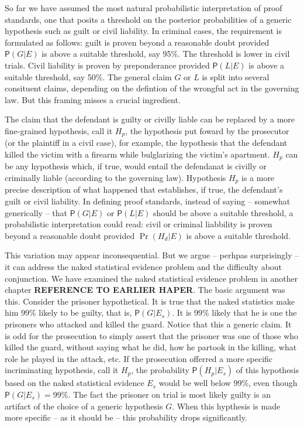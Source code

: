 \documentclass[10pt,dvipsnames,enabledeprecatedfontcommands]{scrartcl}
\newcommand{\pr}[1]{\mathsf{P}(#1)}
\begin{document}
So far we have assumed the most natural probabilistic interpretation of
proof standards, one that posits a threshold on the posterior
probabilities of a generic hypothesis such as guilt or civil liability.
In criminal cases, the requirement is formulated as follows: guilt is
proven beyond a reasonable doubt provided \(\pr{G | E}\) is above a
suitable threshold, say 95\%. The threshold is lower in civil trials.
Civil liability is proven by preponderance provided \(\pr{L | E}\) is
above a suitable threshold, say 50\%. The general claim \(G\) or \(L\)
is split into several consituent claims, depending on the defintion of
the wrongful act in the governing law. But this framing misses a crucial
ingredient.

The claim that the defendant is guilty or civilly liable can be replaced
by a more fine-grained hypothesis, call it \(H_p\), the hypothesis put
foward by the prosecutor (or the plaintiff in a civil case), for
example, the hypothesis that the defendant killed the victim with a
firearm while bulglarizing the victim's apartment. \(H_p\) can be any
hypothesis which, if true, would entail the defendanat is civilly or
criminally liable (according to the governing law). Hypothesis \(H_p\)
is a more precise description of what happened that establishes, if
true, the defendant's guilt or civil liability. In defining proof
standards, instead of saying -- somewhat generically -- that
\(\pr{G | E}\) or \(\pr{L | E}\) should be above a suitable threshold, a
probabilistic interpretation could read: civil or criminal liabbility is
proven beyond a reasonable doubt provided \(\Pr(H_d | E)\) is above a
suitable threshold.

This variation may appear inconsequential. But we argue -- perhpas
surprisingly -- it can address the naked statistical evidence problem
and the difficulty about conjunction. We have examined the naked
statistical evidence problem in another chapter
\textbf{REFERENCE TO EARLIER HAPER}. The basic argument was this.
Consider the prisoner hypothetical. It is true that the naked statistics
make him 99\% likely to be guilty, that is, \(\pr{G | E_s}\). It is 99\%
likely that he is one the prisoners who attacked and killed the guard.
Notice that this a generic claim. It is odd for the prosecution to
simply assert that the prisoner was one of those who killed the guard,
without saying what he did, how he partook in the killing, what role he
played in the attack, etc. If the prosecution offerred a more specific
incriminating hypothesis, call it \(H_p\), the probability
\(\pr{H_p | E_{s}}\) of this hypothesis based on the naked statistical
evidence \(E_s\) would be well below 99\%, even though
\(\pr{G | E_s}=99\%\). The fact the prisoner on trial is most likely
guilty is an artifact of the choice of a generic hypothesis \(G\). When
this hypthesis is made more specific -- as it should be -- this
probability drops significantly.
\end{document}
